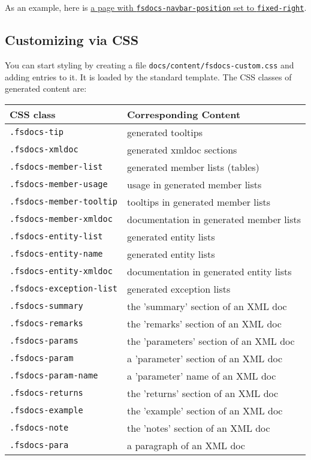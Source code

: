 \documentclass{article}
\begin{document}
As an example, here is \href{templates/leftside/styling.html}{a page with \texttt{fsdocs-navbar-position} set to \texttt{fixed-right}}.
\subsection*{Customizing via CSS}



You can start styling by creating a file \texttt{docs/content/fsdocs-custom.css} and adding entries to it.  It is loaded by
the standard template.  The CSS classes of generated content are:
\begin{tabular}{|l|l|}\hline
\textbf{CSS class} & \textbf{Corresponding Content}\\ \hline\hline
\texttt{.fsdocs-tip} & generated tooltips\\ \hline
\texttt{.fsdocs-xmldoc} & generated xmldoc sections\\ \hline
\texttt{.fsdocs-member-list} & generated member lists (tables)\\ \hline
\texttt{.fsdocs-member-usage} & usage in generated member lists\\ \hline
\texttt{.fsdocs-member-tooltip} & tooltips in generated member lists\\ \hline
\texttt{.fsdocs-member-xmldoc} & documentation in generated member lists\\ \hline
\texttt{.fsdocs-entity-list} & generated entity lists\\ \hline
\texttt{.fsdocs-entity-name} & generated entity lists\\ \hline
\texttt{.fsdocs-entity-xmldoc} & documentation in generated entity lists\\ \hline
\texttt{.fsdocs-exception-list} & generated exception lists\\ \hline
\texttt{.fsdocs-summary} & the 'summary' section of an XML doc\\ \hline
\texttt{.fsdocs-remarks} & the 'remarks' section of an XML doc\\ \hline
\texttt{.fsdocs-params} & the 'parameters' section of an XML doc\\ \hline
\texttt{.fsdocs-param} & a 'parameter' section of an XML doc\\ \hline
\texttt{.fsdocs-param-name} & a 'parameter' name of an XML doc\\ \hline
\texttt{.fsdocs-returns} & the 'returns' section of an XML doc\\ \hline
\texttt{.fsdocs-example} & the 'example' section of an XML doc\\ \hline
\texttt{.fsdocs-note} & the 'notes' section of an XML doc\\ \hline
\texttt{.fsdocs-para} & a paragraph of an XML doc\\ \hline
\end{tabular}
\end{document}
